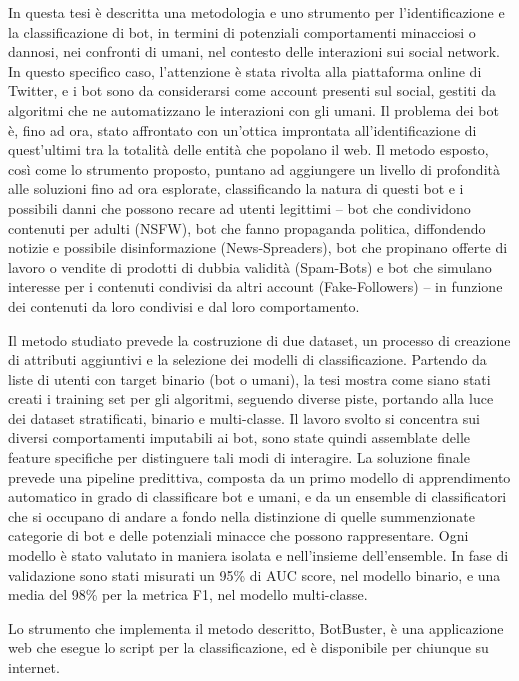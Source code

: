 
In questa tesi è descritta una metodologia e uno strumento per l'identificazione e la classificazione di bot, in termini di potenziali comportamenti minacciosi o dannosi, nei confronti di umani, nel contesto delle interazioni sui social network.
In questo specifico caso, l'attenzione è stata rivolta alla piattaforma online di Twitter, e i bot sono da considerarsi come account presenti sul social, gestiti da algoritmi che ne automatizzano le interazioni con gli umani.
Il problema dei bot è, fino ad ora, stato affrontato con un'ottica improntata all'identificazione di quest'ultimi tra la totalità delle entità che popolano il web.
Il metodo esposto, così come lo strumento proposto, puntano ad aggiungere un livello di profondità alle soluzioni fino ad ora esplorate, classificando la natura di questi bot e i possibili danni che possono recare ad utenti legittimi -- bot che condividono contenuti per adulti (NSFW), bot che fanno propaganda politica, diffondendo notizie e possibile disinformazione (News-Spreaders), bot che propinano offerte di lavoro o vendite di prodotti di dubbia validità (Spam-Bots) e bot che simulano interesse per i contenuti condivisi da altri account (Fake-Followers) -- in funzione dei contenuti da loro condivisi e dal loro comportamento.

Il metodo studiato prevede la costruzione di due dataset, un processo di creazione di attributi aggiuntivi e la selezione dei modelli di classificazione.
Partendo da liste di utenti con target binario (bot o umani), la tesi mostra come siano stati creati i training set per gli algoritmi, seguendo diverse piste, portando alla luce dei dataset stratificati, binario e multi-classe.
Il lavoro svolto si concentra sui diversi comportamenti imputabili ai bot, sono state quindi assemblate delle feature specifiche per distinguere tali modi di interagire.
La soluzione finale prevede una pipeline predittiva, composta da un primo modello di apprendimento automatico in grado di classificare bot e umani, e da un ensemble di classificatori che si occupano di andare a fondo nella distinzione di quelle summenzionate categorie di bot e delle potenziali minacce che possono rappresentare.
Ogni modello è stato valutato in maniera isolata e nell'insieme dell'ensemble. In fase di validazione sono stati misurati un 95\% di AUC score, nel modello binario, e una media del 98\% per la metrica F1, nel modello multi-classe.

Lo strumento che implementa il metodo descritto, BotBuster, è una applicazione web che esegue lo script per la classificazione, ed è disponibile per chiunque su internet.
